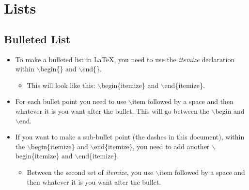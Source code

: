 \documentclass{article}
\begin{document}
	\section{Lists}
		\subsection{Bulleted List}
			\begin{itemize}
				\item To make a bulleted list in \LaTeX{}, you need to use the \textit{itemize} declaration within $\backslash$begin\{\} and $\backslash$end\{\}.
				\begin{itemize}
					\item This will look like this: $\backslash$begin\{itemize\} and $\backslash$end\{itemize\}.
				\end{itemize}
				\item For each bullet point you need to use $\backslash$item followed by a space and then whatever it is you want after the bullet. This will go between the $\backslash$begin and $\backslash$end.
				\item If you want to make a sub-bullet point (the dashes in this document), within the $\backslash$begin\{itemize\} and $\backslash$end\{itemize\}, you need to add another $\backslash$begin\{itemize\} and $\backslash$end\{itemize\}.
				\begin{itemize}
					\item Between the second set of \textit{itemize}, you  use $\backslash$item followed by a space and then whatever it is you want after the bullet.
				\end{itemize}
			\end{itemize}
\end{document}
